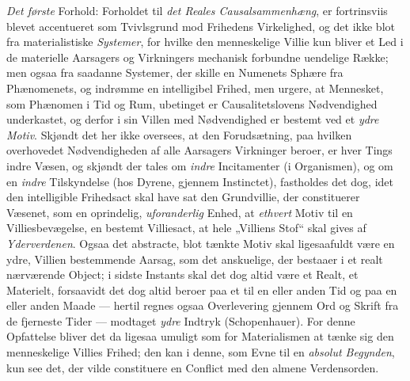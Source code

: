 \emph{Det første} Forhold: Forholdet til \emph{det Reales Causalsammenhæng}, er
fortrinsviis blevet accentueret som Tvivlsgrund mod Frihedens Virkelighed, og det
ikke blot fra materialistiske \emph{Systemer}, for hvilke den menneskelige Villie
kun bliver et Led i de materielle Aarsagers og Virkningers mechanisk forbundne
uendelige Række; men ogsaa fra saadanne Systemer, der skille en Numenets Sphære
fra Phænomenets, og indrømme en intelligibel Frihed, men urgere, at Mennesket,
som Phænomen i Tid og Rum, ubetinget er Causalitetslovens Nødvendighed
underkastet, og derfor i sin Villen med Nødvendighed er bestemt ved et
\emph{ydre Motiv}. Skjøndt det her ikke oversees, at den Forudsætning, paa
hvilken overhovedet Nødvendigheden af alle Aarsagers Virkninger beroer, er hver
Tings indre Væsen, og skjøndt der tales om \emph{indre} Incitamenter (i
Organismen), og om en \emph{indre} Tilskyndelse (hos Dyrene, gjennem Instinctet),
fastholdes det dog, idet den intelligible Frihedsact skal have sat den
Grundvillie, der constituerer Væsenet, som en oprindelig, \emph{uforanderlig}
Enhed, at \emph{ethvert} Motiv til en Villiesbevægelse, en bestemt Villiesact, at
hele „Villiens Stof“ skal gives af \emph{Yderverdenen}. Ogsaa det abstracte, blot
tænkte Motiv skal ligesaafuldt være en ydre, Villien bestemmende Aarsag, som det
anskuelige, der bestaaer i et
 realt nærværende Object; i sidste Instants skal det dog altid være et Realt, et
Materielt, forsaavidt det dog altid beroer paa et til en eller anden Tid og paa
en eller anden Maade --- hertil regnes ogsaa Overlevering gjennem Ord og Skrift
fra de fjerneste Tider --- modtaget \emph{ydre} Indtryk (Schopenhauer). For denne
Opfattelse bliver det da ligesaa umuligt som for Materialismen at tænke sig den
menneskelige Villies Frihed; den kan i denne, som Evne til en \emph{absolut
Begynden}, kun see det, der vilde constituere en Conflict med den almene
Verdensorden.

